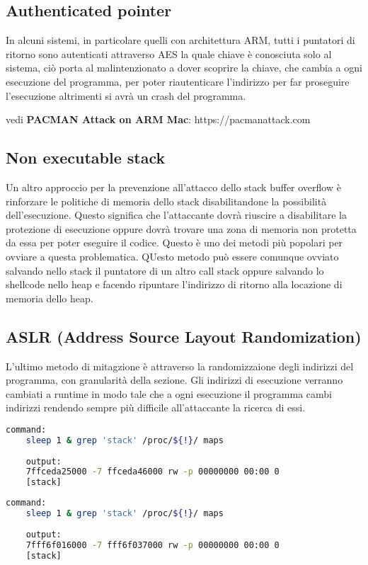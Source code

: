 \subsection{Authenticated pointer}
In alcuni sistemi, in particolare quelli con architettura ARM, tutti i puntatori di ritorno sono autenticati attraverso AES la quale chiave è conosciuta solo al sistema, ciò porta al malintenzionato a dover scoprire la chiave, che cambia a ogni esecuzione del programma, per poter riautenticare l'indirizzo per far proseguire l'esecuzione altrimenti si avrà un crash del programma.
\begin{ex}
    vedi \textbf{PACMAN Attack on ARM Mac}: https://pacmanattack.com
\end{ex}

\subsection{Non executable stack}
Un altro approccio per la prevenzione all'attacco dello stack buffer overflow è rinforzare le politiche di memoria dello stack disabilitandone la possibilità dell'esecuzione.
Questo significa che l'attaccante dovrà riuscire a disabilitare la protezione di esecuzione oppure dovrà trovare una zona di memoria non protetta da essa per poter eseguire il codice.
Questo è uno dei metodi più popolari per ovviare a questa problematica.
QUesto metodo può essere comunque ovviato salvando nello stack il puntatore di un altro call stack oppure salvando lo shellcode nello heap e facendo ripuntare l'indirizzo di ritorno alla locazione di memoria dello heap.

\subsection{ASLR (Address Source Layout Randomization)}
L'ultimo metodo di mitagzione è attraverso la randomizzaione degli indirizzi del programma, con granularità della sezione. Gli indirizzi di esecuzione verranno cambiati a runtime in modo tale che a ogni esecuzione il programma cambi indirizzi rendendo sempre più difficile all'attaccante la ricerca di essi.

\begin{lstlisting}[language=bash]
    command:
    sleep 1 & grep 'stack' /proc/${!}/ maps
    
    output:
    7ffceda25000 -7 ffceda46000 rw -p 00000000 00:00 0
    [stack]
\end{lstlisting}
\begin{lstlisting}[language=bash]
    command:
    sleep 1 & grep 'stack' /proc/${!}/ maps
    
    output:
    7fff6f016000 -7 fff6f037000 rw -p 00000000 00:00 0
    [stack]
\end{lstlisting}

